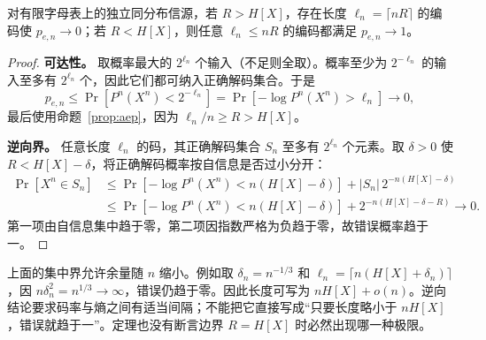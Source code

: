\documentclass[lang=cn,a4paper,fontset=none,zihao=false,10pt,openany,twoside]{beautybook}
\numberwithin{algorithm}{chapter}
\begin{document}
\begin{theorem}[定长信源编码的阈值]\label{thm:fixed-source-coding}
对有限字母表上的独立同分布信源，若 $R>H[X]$，存在长度 $\ell_n=\lceil nR\rceil$ 的编码使 $p_{e,n}\to0$；若 $R<H[X]$，则任意 $\ell_n\le nR$ 的编码都满足 $p_{e,n}\to1$。
\end{theorem}
\begin{proof}
\textbf{可达性。} 取概率最大的 $2^{\ell_n}$ 个输入（不足则全取）。概率至少为 $2^{-\ell_n}$ 的输入至多有 $2^{\ell_n}$ 个，因此它们都可纳入正确解码集合。于是
\[
 p_{e,n}\le\Pr[P^n(X^n)<2^{-\ell_n}]
 =\Pr[-\log P^n(X^n)>\ell_n]\to0,
\]
最后使用命题~\ref{prop:aep}，因为 $\ell_n/n\ge R>H[X]$。

\textbf{逆向界。} 任意长度 $\ell_n$ 的码，其正确解码集合 $S_n$ 至多有 $2^{\ell_n}$ 个元素。取 $\delta>0$ 使 $R<H[X]-\delta$，将正确解码概率按自信息是否过小分开：
\[
 \begin{aligned}
 \Pr[X^n\in S_n]
 &\le\Pr[-\log P^n(X^n)<n(H[X]-\delta)]
   +|S_n|\,2^{-n(H[X]-\delta)}\\
 &\le\Pr[-\log P^n(X^n)<n(H[X]-\delta)]
   +2^{-n(H[X]-\delta-R)}\to0.
 \end{aligned}
\]
第一项由自信息集中趋于零，第二项因指数严格为负趋于零，故错误概率趋于一。
\end{proof}
\begin{remark}[如何理解接近熵的长度]
上面的集中界允许余量随 $n$ 缩小。例如取 $\delta_n=n^{-1/3}$ 和 $\ell_n=\lceil n(H[X]+\delta_n)\rceil$，因 $n\delta_n^2=n^{1/3}\to\infty$，错误仍趋于零。因此长度可写为 $nH[X]+o(n)$。逆向结论要求码率与熵之间有适当间隔；不能把它直接写成“只要长度略小于 $nH[X]$，错误就趋于一”。定理也没有断言边界 $R=H[X]$ 时必然出现哪一种极限。
\end{remark}
\end{document}

